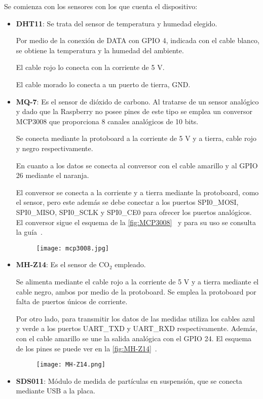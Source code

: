 Se comienza con los sensores con los que cuenta el dispositivo:
\begin{itemize}
	\item \textbf{DHT11}: Se trata del sensor de temperatura y humedad elegido.
	      
	      Por medio de la conexión de DATA con GPIO 4, indicada con el cable blanco, se obtiene la temperatura y la humedad del ambiente. 
	      
	      El cable rojo lo conecta con la corriente de 5 V\@.
	      
	      El cable morado lo conecta a un puerto de tierra, GND\@.
	\item \textbf{MQ-7}: Es el sensor de dióxido de carbono. Al tratarse de un sensor analógico y dado que la Raspberry no posee pines de este tipo se emplea un conversor MCP3008 que proporciona 8 canales analógicos de 10 bits.
	      
	      Se conecta mediante la protoboard a la corriente de 5 V y a tierra, cable rojo y negro respectivamente.
	      
	      En cuanto a los datos se conecta al conversor con el cable amarillo y al GPIO 26 mediante el naranja.
	      
	      El conversor se conecta a la corriente y a tierra mediante la protoboard, como el sensor, pero este además se debe conectar a los puertos SPI0\_MOSI, SPI0\_MISO, SPI0\_SCLK y SPI0\_CE0 para ofrecer los puertos analógicos. El conversor sigue el esquema de la \autoref{fig:MCP3008}~\cite{microchip_technology_inc_27v_2008} y para su uso se consulta la guía~\cite{dicola_raspberry_nodate}.
	      \begin{figure}[H]
		      {\texttt{[image: mcp3008.jpg]}}
	      \end{figure}
	\item \textbf{MH-Z14}: Es el sensor de CO$_2$ empleado.
	      
	      Se alimenta mediante el cable rojo a la corriente de 5 V y a tierra mediante el cable negro, ambos por medio de la protoboard. Se emplea la protoboard por falta de puertos únicos de corriente.
	      
	      Por otro lado, para transmitir los datos de las medidas utiliza los cables azul y verde a los puertos UART\_TXD y UART\_RXD respectivamente. Además, con el cable amarillo se une la salida analógica con el GPIO 24. El esquema de los pines se puede ver en la \autoref{fig:MH-Z14}~\cite{zhengzhou_winsen_electronics_technology_users_nodate}.
	      \begin{figure}[H]
		      {\texttt{[image: MH-Z14.png]}}
	      \end{figure}
	\item \textbf{SDS011}: Módulo de medida de partículas en suspensión, que se conecta mediante USB a la placa.
\end{itemize}

